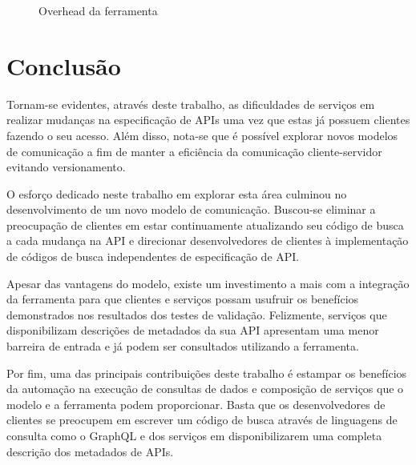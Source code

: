 \documentclass[12pt]{article}
\begin{document}
  \begin{figure}[H]
    \centering
    \caption{Overhead da ferramenta}
  \end{figure}

  \section{Conclusão}\label{sec:figs}

  Tornam-se evidentes, através deste trabalho, as dificuldades de serviços em realizar mudanças na especificação de APIs uma vez que estas já possuem clientes fazendo o seu acesso. Além disso, nota-se que é possível explorar novos modelos de comunicação a fim de manter a eficiência da comunicação cliente-servidor evitando versionamento.

  O esforço dedicado neste trabalho em explorar esta área culminou no desenvolvimento de um novo modelo de comunicação. Buscou-se eliminar a preocupação de clientes em estar continuamente atualizando seu código de busca a cada mudança na API e direcionar desenvolvedores de clientes à implementação de códigos de busca independentes de especificação de API.

  Apesar das vantagens do modelo, existe um investimento a mais com a integração da ferramenta para que clientes e serviços possam usufruir os benefícios demonstrados nos resultados dos testes de validação. Felizmente, serviços que disponibilizam descrições de metadados da sua API apresentam uma menor barreira de entrada e já podem ser consultados utilizando a ferramenta.

  Por fim, uma das principais contribuições deste trabalho é estampar os benefícios da automação na execução de consultas de dados e composição de serviços que o modelo e a ferramenta podem proporcionar. Basta que os desenvolvedores de clientes se preocupem em escrever um código de busca através de linguagens de consulta como o GraphQL e dos serviços em disponibilizarem uma completa descrição dos metadados de APIs.

  
  
\end{document}
